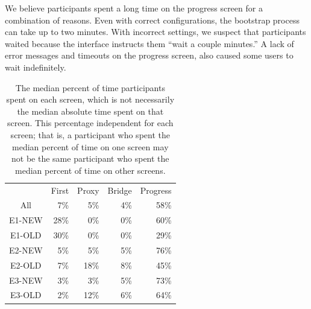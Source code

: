 \documentclass[USenglish,oneside,twocolumn]{article}
\begin{document}
We believe participants spent a long time on the progress screen for a combination of reasons. Even with correct configurations, the bootstrap process can take up to two minutes. With incorrect settings, we suspect that participants waited because the interface instructs them ``wait a couple minutes.'' A lack of error messages and timeouts on the progress screen, also caused some users to wait indefinitely. 

\begin{table}[t]
\centering
	\begin{tabular}{c r r r r}
	& First & Proxy & Bridge & Progress \\
	\noalign{\hrule}
	All & 7\% & 5\% & 4\% & 58\% \\
	E1-NEW & 28\% & 0\% & 0\% & 60\% \\
	E1-OLD & 30\% & 0\% & 0\% & 29\% \\
	E2-NEW & 5\% & 5\% & 5\% & 76\% \\
	E2-OLD & 7\% & 18\% & 8\% & 45\% \\
	E3-NEW & 3\% & 3\% & 5\% & 73\% \\
	E3-OLD & 2\% & 12\% & 6\% & 64\% \\
	\end{tabular}
\caption{The median percent of time participants spent on each screen, which is not
necessarily the median absolute time spent on that screen. 
This percentage independent for each screen; that is, a participant who spent the median percent 
of time on one screen may not be the same participant who spent the median percent
of time on other screens.} 
\label{table:median_time}
\end{table}

\end{document}

